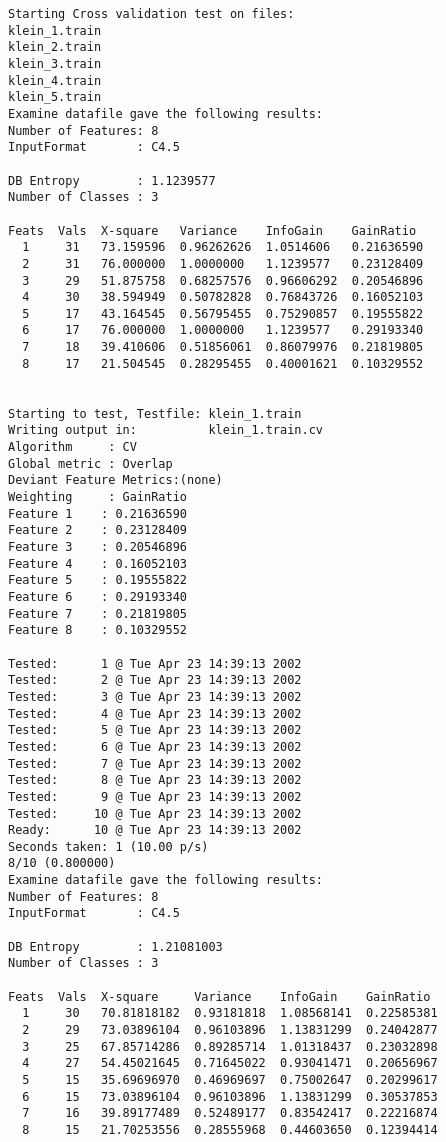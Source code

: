 \documentclass{article}
\begin{document}
\begin{verbatim}
Starting Cross validation test on files:
klein_1.train
klein_2.train
klein_3.train
klein_4.train
klein_5.train
Examine datafile gave the following results:
Number of Features: 8
InputFormat       : C4.5

DB Entropy        : 1.1239577
Number of Classes : 3

Feats  Vals  X-square   Variance    InfoGain    GainRatio
  1     31   73.159596  0.96262626  1.0514606   0.21636590
  2     31   76.000000  1.0000000   1.1239577   0.23128409
  3     29   51.875758  0.68257576  0.96606292  0.20546896
  4     30   38.594949  0.50782828  0.76843726  0.16052103
  5     17   43.164545  0.56795455  0.75290857  0.19555822
  6     17   76.000000  1.0000000   1.1239577   0.29193340
  7     18   39.410606  0.51856061  0.86079976  0.21819805
  8     17   21.504545  0.28295455  0.40001621  0.10329552


Starting to test, Testfile: klein_1.train
Writing output in:          klein_1.train.cv
Algorithm     : CV
Global metric : Overlap
Deviant Feature Metrics:(none)
Weighting     : GainRatio
Feature 1	 : 0.21636590
Feature 2	 : 0.23128409
Feature 3	 : 0.20546896
Feature 4	 : 0.16052103
Feature 5	 : 0.19555822
Feature 6	 : 0.29193340
Feature 7	 : 0.21819805
Feature 8	 : 0.10329552

Tested:      1 @ Tue Apr 23 14:39:13 2002
Tested:      2 @ Tue Apr 23 14:39:13 2002
Tested:      3 @ Tue Apr 23 14:39:13 2002
Tested:      4 @ Tue Apr 23 14:39:13 2002
Tested:      5 @ Tue Apr 23 14:39:13 2002
Tested:      6 @ Tue Apr 23 14:39:13 2002
Tested:      7 @ Tue Apr 23 14:39:13 2002
Tested:      8 @ Tue Apr 23 14:39:13 2002
Tested:      9 @ Tue Apr 23 14:39:13 2002
Tested:     10 @ Tue Apr 23 14:39:13 2002
Ready:      10 @ Tue Apr 23 14:39:13 2002
Seconds taken: 1 (10.00 p/s)
8/10 (0.800000)
Examine datafile gave the following results:
Number of Features: 8
InputFormat       : C4.5

DB Entropy        : 1.21081003
Number of Classes : 3

Feats  Vals  X-square     Variance    InfoGain    GainRatio
  1     30   70.81818182  0.93181818  1.08568141  0.22585381
  2     29   73.03896104  0.96103896  1.13831299  0.24042877
  3     25   67.85714286  0.89285714  1.01318437  0.23032898
  4     27   54.45021645  0.71645022  0.93041471  0.20656967
  5     15   35.69696970  0.46969697  0.75002647  0.20299617
  6     15   73.03896104  0.96103896  1.13831299  0.30537853
  7     16   39.89177489  0.52489177  0.83542417  0.22216874
  8     15   21.70253556  0.28555968  0.44603650  0.12394414



\end{verbatim}
\end{document}
